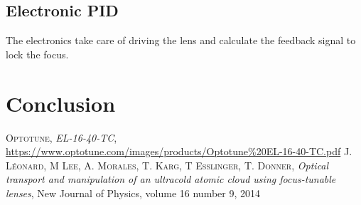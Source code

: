\documentclass[a4paper,10pt]{article}
\begin{document}
\subsection{Electronic PID}
The electronics take care of driving the lens and calculate the feedback signal to lock the focus.

\section{Conclusion}

 \begin{thebibliography}{99}
 \textsc{Optotune}, \textit{EL-16-40-TC}, \url{https://www.optotune.com/images/products/Optotune%20EL-16-40-TC.pdf}
%
 \textsc{J. Léonard, M Lee, A. Morales, T. Karg, T Esslinger, T. Donner}, \textit{Optical transport and manipulation of an ultracold atomic cloud using focus-tunable lenses}, New Journal of Physics, volume 16 number 9, 2014

%
%
%
%
%
 \end{thebibliography}
\end{document}

